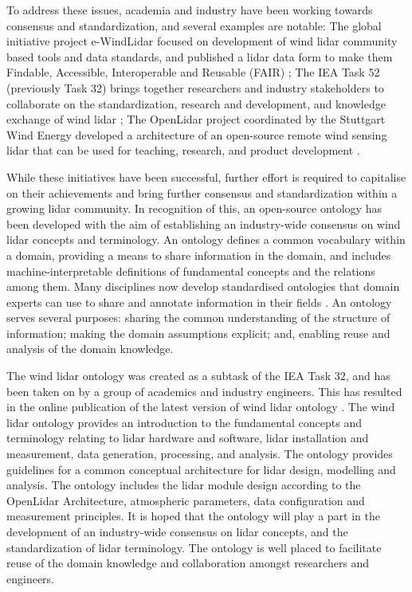 \documentclass[remotesensing,article,submit,pdftex,moreauthors]{Definitions/mdpi}
\begin{document}
To address these issues, academia and industry have been working towards consensus and standardization, and several examples are notable:
The global initiative project e-WindLidar focused on development of wind lidar community based tools and data standards, and published a lidar data form to make them Findable, Accessible, Interoperable and Reusable (FAIR) \cite{ref-Vasiljevi}; 
The IEA Task 52 (previously Task 32) brings together researchers and industry stakeholders to collaborate on the standardization, research and development, and knowledge exchange of wind lidar \cite{ref-Clifton-Schlipf};
The OpenLidar project coordinated by the Stuttgart Wind Energy developed a architecture of an open-source remote wind sensing lidar that can be used for teaching, research, and product development \cite{ref-SWE}.

While these initiatives have been successful, further effort is required to capitalise on their achievements and bring further consensus and standardization within a growing lidar community.
In recognition of this, an open-source ontology has been developed with the aim of establishing an industry-wide consensus on wind lidar concepts and terminology.
An ontology defines a common vocabulary within a domain, providing a means to share information in the domain, and includes machine-interpretable definitions of fundamental concepts and the relations among them.
Many disciplines now develop standardised ontologies that domain experts can use to share and annotate information in their fields \cite{ref-Noy}.
An ontology serves several purposes: sharing the common understanding of the structure of information; making the domain assumptions explicit; and, enabling reuse and analysis of the domain knowledge.

The wind lidar ontology \cite{ref-Clifton-Costa} was created as a subtask of the IEA Task 32, and has been taken on by a group of academics and industry engineers.
This has resulted in the online publication of the latest version of wind lidar ontology \cite{ref-OntoWeb}.
The wind lidar ontology provides an introduction to the fundamental concepts and terminology relating to lidar hardware and software, lidar installation and measurement, data generation, processing, and analysis.
The ontology provides guidelines for a common conceptual architecture for lidar design, modelling and analysis.
The ontology includes the lidar module design according to the OpenLidar Architecture, atmospheric parameters, data configuration and measurement principles.
It is hoped that the ontology will play a part in the development of an industry-wide consensus on lidar concepts, and the standardization of lidar terminology.
The ontology is well placed to facilitate reuse of the domain knowledge and collaboration amongst researchers and engineers.
\end{document}
